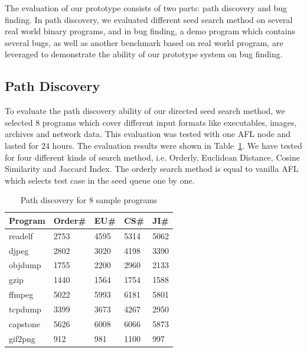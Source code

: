 The evaluation of our prototype consists of two parts: path discovery and bug finding. In path discovery, we evaluated different seed search method on several real world binary programs, and in bug finding, a demo program which contains several bugs, as well as another benchmark based on real world program, are leveraged to demonstrate the ability of our prototype system on bug finding.

\subsection{Path Discovery}
To evaluate the path discovery ability of our directed seed search method, we selected 8 programs which cover different input formats like executables, images, archives and network data. This evaluation was tested with one AFL node and lasted for 24 hours. The evaluation results were shown in Table~\ref{PD-8samples}. We have tested for four different kinds of search method, i.e. Orderly, Euclidean Distance, Cosine Similarity and Jaccard Index. The orderly search method is equal to vanilla AFL which selects test case in the seed queue one by one.  

\begin{table}
  \caption{\label{PD-8samples}Path discovery for 8 sample programs}
  \centering
	\begin{tabular}{p{2cm}<{\centering} p{1.5cm}<{\centering} p{1.5cm}<{\centering} p{1.5cm}<{\centering} p{1.5cm}<{\centering}}
		\toprule
		Program  & Order\# & EU\# & CS\# & JI\# \\ 
		\midrule
		readelf  &    2753 & 4595 & 5314 & 5062 \\
		 djpeg   &    2802 & 3020 & 4198 & 3390 \\
		objdump  &    1755 & 2200 & 2960 & 2133 \\
		  gzip   &    1440 & 1564 & 1754 & 1588 \\
		 ffmpeg  &    5022 & 5993 & 6181 & 5801 \\
		tcpdump  &    3399 & 3673 & 4267 & 2950 \\
		capstone &    5626 & 6008 & 6066 & 5873 \\
		gif2png  &     912 &  981 & 1100 &  997 \\ 
		\bottomrule
	\end{tabular}
\end{table}

